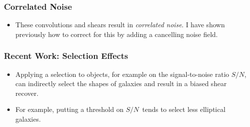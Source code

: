 \documentclass{beamer}
\newcommand{\snr}{$S/N$}
\begin{document}
\frame
{
    \frametitle{Correlated Noise}

 
    \begin{itemize}

        \item These convolutions and shears result in {\em {\color{gold}
            correlated noise}}.  I have shown previously how to correct for
            this by adding a cancelling noise field.


    \end{itemize}

}

\frame
{
    \frametitle{Recent Work: Selection Effects}

 

    \begin{itemize}

        \item  Applying a selection to objects, for example on the signal-to-noise
            ratio \snr, can indirectly select the shapes of galaxies and result
            in a biased shear recover.

        \item For example, putting a threshold on \snr\ tends to select less
            elliptical galaxies.

    \end{itemize}

}
\end{document}
